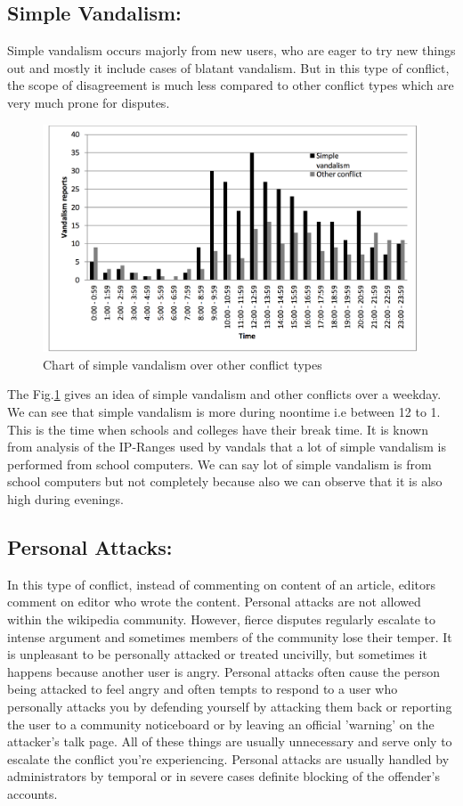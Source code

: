 \documentclass[12pt]{article}
\begin{document}
\subsection*{Simple Vandalism:} Simple vandalism occurs majorly from new users, who are eager to try new things out and mostly it include cases of blatant vandalism. But in this type of conflict, the scope of disagreement is much less compared to other conflict types which are very much prone for disputes.\\
\begin{figure}[h]
\centering
\includegraphics[scale=0.5]{simple.png}
\caption{Chart of simple vandalism over other conflict types\cite{main}}
\label{simple}
\end{figure}
The Fig.\ref{simple} gives an idea of simple vandalism and other conflicts over a weekday. We can see that simple vandalism is more during noontime i.e between 12 to 1. This is the time when schools and colleges have their break time. It is known from analysis of the IP-Ranges used by vandals that a lot of simple vandalism is performed from school computers. We can say lot of simple vandalism is from school computers but not completely because  also we can observe that it is also high during evenings.
\subsection*{Personal Attacks:}
In this type of conflict, instead of commenting on content of an article, editors comment on editor who wrote the content. Personal attacks are not allowed within the wikipedia community.  However, fierce disputes regularly escalate to intense argument and sometimes members of the community lose their temper. It is unpleasant to be personally attacked or treated uncivilly, but sometimes it happens because another user is angry. Personal attacks often cause the person being attacked to feel angry and often tempts to respond to a user who personally attacks you by defending yourself by attacking them back or reporting the user to a community noticeboard or by leaving an official 'warning' on the attacker's talk page. All of these things are usually unnecessary and serve only to escalate the conflict you're experiencing. Personal attacks are usually handled by administrators by temporal or in severe cases definite blocking of the offender's accounts.
\end{document}
